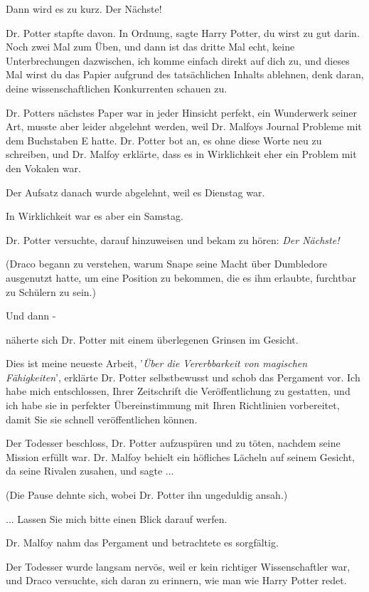 \glqq{}Dann wird es zu kurz. Der Nächste!\grqq{}

Dr. Potter stapfte davon. \glqq{}In Ordnung\grqq{}, sagte Harry Potter,
\glqq{}du wirst zu gut darin. Noch zwei Mal zum Üben, und dann ist das dritte
Mal echt, keine Unterbrechungen dazwischen, ich komme einfach direkt auf dich
zu, und dieses Mal wirst du das Papier aufgrund des tatsächlichen Inhalts
ablehnen, denk daran, deine wissenschaftlichen Konkurrenten schauen zu.\grqq{}

Dr. Potters nächstes Paper war in jeder Hinsicht perfekt, ein Wunderwerk seiner
Art, musste aber leider abgelehnt werden, weil Dr. Malfoys Journal Probleme mit
dem Buchstaben E hatte. Dr. Potter bot an, es ohne diese Worte neu zu schreiben,
und Dr. Malfoy erklärte, dass es in Wirklichkeit eher ein Problem mit den
Vokalen war.

Der Aufsatz danach wurde abgelehnt, weil es Dienstag war.

In Wirklichkeit war es aber ein Samstag.

Dr. Potter versuchte, darauf hinzuweisen und bekam zu hören: \emph{\glqq{}Der
Nächste!\grqq{}}

(Draco begann zu verstehen, warum Snape seine Macht über Dumbledore ausgenutzt
hatte, um eine Position zu bekommen, die es ihm erlaubte, furchtbar zu Schülern
zu sein.)

Und dann -

näherte sich Dr. Potter mit einem überlegenen Grinsen im Gesicht.

\glqq{}Dies ist meine neueste Arbeit, '\emph{Über die Vererbbarkeit von
magischen Fähigkeiten}', erklärte Dr. Potter selbstbewusst und schob das
Pergament vor. \glqq{}Ich habe mich entschlossen, Ihrer Zeitschrift die
Veröffentlichung zu gestatten, und ich habe sie in perfekter Übereinstimmung mit
Ihren Richtlinien vorbereitet, damit Sie sie schnell veröffentlichen
können.\grqq{}

Der Todesser beschloss, Dr. Potter aufzuspüren und zu töten, nachdem seine
Mission erfüllt war. Dr. Malfoy behielt ein höfliches Lächeln auf seinem
Gesicht, da seine Rivalen zusahen, und sagte ...

(Die Pause dehnte sich, wobei Dr. Potter ihn ungeduldig ansah.)

... \glqq{}Lassen Sie mich bitte einen Blick darauf werfen.\grqq{}

Dr. Malfoy nahm das Pergament und betrachtete es sorgfältig.

Der Todesser wurde langsam nervös, weil er kein richtiger Wissenschaftler war,
und Draco versuchte, sich daran zu erinnern, wie man wie Harry Potter redet.

